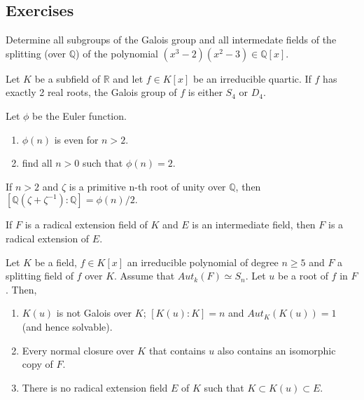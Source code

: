 \subsection{Exercises}

\begin{problem}[Hungerford 5.4.11]
Determine all subgroups of the Galois group and all intermedate fields of the splitting (over $\mathbb{Q}$) of the polynomial $(x^{3}-2)(x^{2}-3)\in \mathbb{Q}[x]$.
\end{problem}

\begin{problem}[Hungerford 5.4.12]
Let $K$ be a subfield of $\mathbb{R}$ and let $f \in K[x]$ be an irreducible quartic. If $f$ has exactly 2 real roots, the Galois group of $f$ is either $S_{4}$ or $D_{4}$.
\end{problem}

\begin{problem}[Hungerford 5.8.3]
Let $\phi$ be the Euler function.
\begin{enumerate}
    \item $\phi(n)$ is even for $n>2$.
    \item find all $n>0$ such that $\phi(n)=2$.
\end{enumerate}
\end{problem}

\begin{problem}[Hungerford 5.8.9]
If $n>2$ and $\zeta$ is a primitive n-th root of unity over $\mathbb{Q}$, then $[\mathbb{Q}(\zeta + \zeta^{-1}): \mathbb{Q}]=\phi(n)/2.$
\end{problem}

\begin{problem}[Hungerford 5.9.1]
If $F$ is a radical extension field of $K$ and $E$ is an intermediate field, then $F$ is a radical extension of $E$.
\end{problem}

\begin{problem}[Hungerford 5.9.3]
Let $K$ be a field, $f\in K[x]$ an irreducible polynomial of degree $n\geq 5$ and $F$ a splitting field of $f$ over $K$. Assume that $Aut_{k}(F)\simeq S_{n}$. Let $u$ be a root of $f$ in $F$. Then,
\begin{enumerate}
    \item $K(u)$ is not Galois over $K$; $[K(u):K]=n$ and $Aut_{K}(K(u))=1$ (and hence solvable).
    \item Every normal closure over $K$ that contains $u$ also contains an isomorphic copy of $F$.
    \item There is no radical extension field $E$ of $K$ such that $K\subset K(u)\subset E$.
\end{enumerate}
\end{problem}

